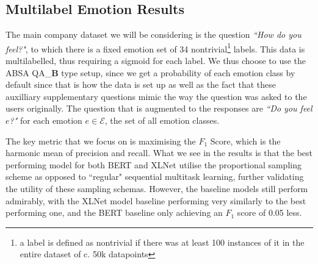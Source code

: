 \subsection{Multilabel Emotion Results}
The main company dataset we will be considering is the question \textit{``How do you feel?"}, to which there is a fixed emotion set of 34 nontrivial\footnote{a label is defined as nontrivial if there was at least 100 instances of it in the entire dataset of c. 50k datapoints} labels. This data is multilabelled, thus requiring a sigmoid for each label. We thus choose to use the ABSA QA\_\textbf{B} type setup, since we get a probability of each emotion class by default since that is how the data is set up as well as the fact that these auxilliary supplementary questions mimic the way the question was asked to the users originally. The question that is augmented to the responses are \textit{``Do you feel $e$?"} for each emotion $e \in \mathcal{E}$, the set of all emotion classes.
\begin{center}
	\label{table:experiments:streetbeesresults}
\end{center}

The key metric that we focus on is maximising the $F_1$ Score, which is the harmonic mean of precision and recall. What we see in the results is that the best performing model for both BERT and XLNet utilise the proportional sampling scheme as opposed to ``regular" sequential multitask learning, further validating the utility of these sampling schemas. However, the baseline models still perform admirably, with the XLNet model baseline performing very similarly to the best performing one, and the BERT baseline only achieving an $F_1$ score of 0.05 less.


